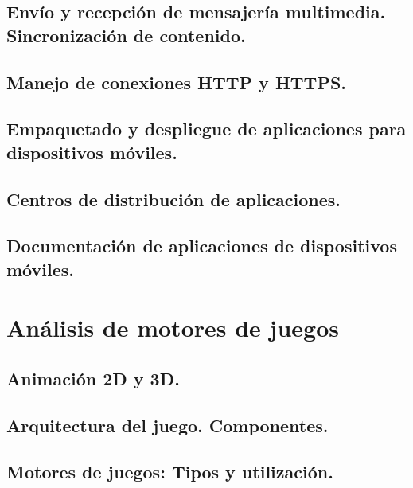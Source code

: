 \documentclass[a4paper,12pt,spanish]{sphinxmanual}
\begin{document}
\section{Envío y recepción de mensajería multimedia. Sincronización de contenido.}
\label{tema2:envio-y-recepcion-de-mensajeria-multimedia-sincronizacion-de-contenido}

\section{Manejo de conexiones HTTP y HTTPS.}
\label{tema2:manejo-de-conexiones-http-y-https}

\section{Empaquetado y despliegue de aplicaciones para dispositivos móviles.}
\label{tema2:empaquetado-y-despliegue-de-aplicaciones-para-dispositivos-moviles}

\section{Centros de distribución de aplicaciones.}
\label{tema2:centros-de-distribucion-de-aplicaciones}

\section{Documentación de aplicaciones de dispositivos móviles.}
\label{tema2:documentacion-de-aplicaciones-de-dispositivos-moviles}

\chapter{Análisis de motores de juegos}
\label{index:analisis-de-motores-de-juegos}

\section{Animación 2D y 3D.}
\label{index:animacion-2d-y-3d}

\section{Arquitectura del juego. Componentes.}
\label{index:arquitectura-del-juego-componentes}

\section{Motores de juegos: Tipos y utilización.}
\label{index:motores-de-juegos-tipos-y-utilizacion}
\end{document}
